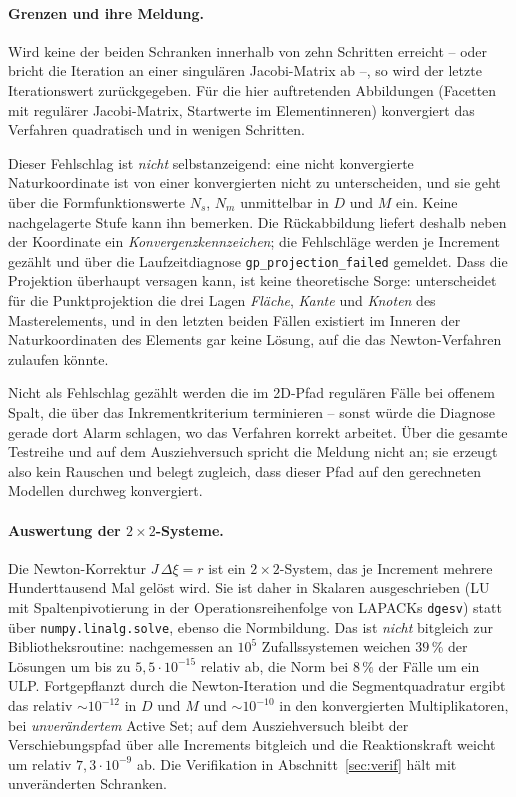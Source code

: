 \documentclass[a4paper,11pt]{article}
\def\bm#1{#1}%
\newcommand{\code}[1]{\texttt{\small #1}}
\begin{document}
\paragraph{Grenzen und ihre Meldung.}
Wird keine der beiden Schranken innerhalb von zehn Schritten erreicht -- oder bricht die Iteration an
einer singulären Jacobi-Matrix ab --, so wird der letzte Iterationswert zurückgegeben. Für die hier
auftretenden Abbildungen (Facetten mit regulärer Jacobi-Matrix, Startwerte im Elementinneren)
konvergiert das Verfahren quadratisch und in wenigen Schritten.

Dieser Fehlschlag ist \emph{nicht} selbstanzeigend: eine nicht konvergierte Naturkoordinate ist von
einer konvergierten nicht zu unterscheiden, und sie geht über die Formfunktionswerte $\bm N_s$,
$\bm N_m$ unmittelbar in $\bm D$ und $\bm M$ ein. Keine nachgelagerte Stufe kann ihn bemerken.
Die Rückabbildung liefert deshalb neben der Koordinate ein \emph{Konvergenzkennzeichen}; die
Fehlschläge werden je Increment gezählt und über die Laufzeitdiagnose
\code{gp\_projection\_failed} gemeldet. Dass die Projektion überhaupt versagen kann, ist keine
theoretische Sorge: \citet{wriggers} unterscheidet für die Punktprojektion die drei Lagen
\emph{Fläche}, \emph{Kante} und \emph{Knoten} des Masterelements, und in den letzten beiden Fällen
existiert im Inneren der Naturkoordinaten des Elements gar keine Lösung, auf die das Newton-Verfahren
zulaufen könnte.

Nicht als Fehlschlag gezählt werden die im 2D-Pfad regulären Fälle bei offenem Spalt, die über das
Inkrementkriterium terminieren -- sonst würde die Diagnose gerade dort Alarm schlagen, wo das
Verfahren korrekt arbeitet. Über die gesamte Testreihe und auf dem Ausziehversuch spricht die Meldung
nicht an; sie erzeugt also kein Rauschen und belegt zugleich, dass dieser Pfad auf den gerechneten
Modellen durchweg konvergiert.

\paragraph{Auswertung der $2\times2$-Systeme.}
Die Newton-Korrektur $\bm J\,\Delta\bm\xi=\bm r$ ist ein $2\times2$-System, das je Increment
mehrere Hunderttausend Mal gelöst wird. Sie ist daher in Skalaren ausgeschrieben (LU mit
Spaltenpivotierung in der Operationsreihenfolge von LAPACKs \code{dgesv}) statt über
\code{numpy.linalg.solve}, ebenso die Normbildung. Das ist \emph{nicht} bitgleich zur
Bibliotheksroutine: nachgemessen an $10^5$ Zufallssystemen weichen $39\,\%$ der Lösungen um bis zu
$5{,}5\cdot10^{-15}$ relativ ab, die Norm bei $8\,\%$ der Fälle um ein ULP. Fortgepflanzt durch die
Newton-Iteration und die Segmentquadratur ergibt das relativ $\sim10^{-12}$ in $\bm D$ und $\bm M$
und $\sim10^{-10}$ in den konvergierten Multiplikatoren, bei \emph{unverändertem} Active Set; auf dem
Ausziehversuch bleibt der Verschiebungspfad über alle Increments bitgleich und die Reaktionskraft
weicht um relativ $7{,}3\cdot10^{-9}$ ab. Die Verifikation in Abschnitt~\ref{sec:verif} hält mit
unveränderten Schranken.
\end{document}
